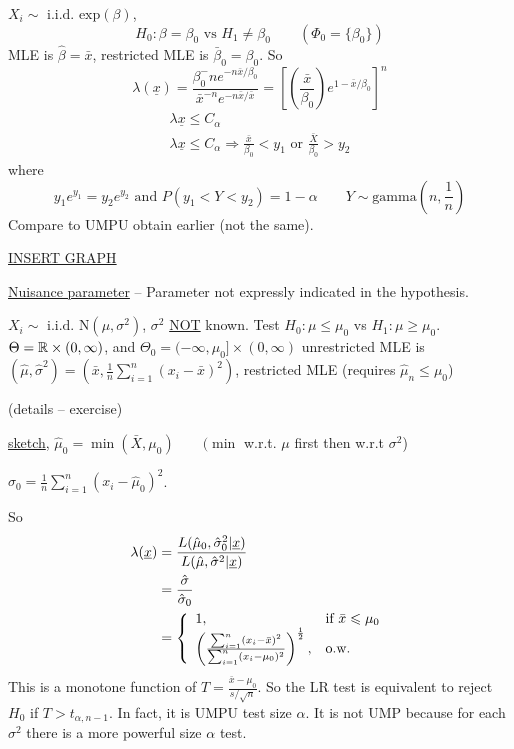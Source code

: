 \documentclass[english, 11pt]{article}
\newcommand{\lp}{\left(}
\newcommand{\rp}{\right)}
\begin{document}
\begin{exmp}
$X_i\sim\text{ i.i.d. exp}(\beta)$, 
$$
H_0:\beta=\beta_0\text{ vs }H_1\not= \beta_0\qquad (\Phi_0=\{\beta_0\})
$$
MLE is $\hat{\beta}=\bar{x}$, restricted MLE is $\bar{\beta}_0=\beta_0$. So 
$$
\lambda(\underline{x})=\frac{\beta_0^-ne^{-n\bar{x}/\beta_0}}{\bar{x}^{-n}e^{-n\bar{x}/\bar{x}}}=\left[\lp \frac{\bar{x}}{\beta_0}\rp e^{1-\bar{x}/\beta_0}\right]^n
$$
$$
\begin{aligned}
\lambda{\underline{x}}\leqslant C_\alpha\\
\lambda{\underline{x}}\leqslant C_\alpha\Rightarrow\frac{\bar{x}}{\beta_0}<y_1\text{ or }\frac{\bar{X}}{\beta_0}>y_2
\end{aligned}
$$
where
$$
y_1e^{y_1}=y_2e^{y_2}\text{  and  }P\lp y_1<Y<y_2\rp=1-\alpha\qquad Y\sim \text{gamma}\lp n, \frac{1}{n}\rp
$$
Compare to UMPU obtain earlier (not the same).

{\Huge \underline{INSERT GRAPH}}
\end{exmp}

\vspace{5 mm}

\underline{Nuisance parameter} -- Parameter not expressly indicated in the hypothesis.

\begin{exmp}\label{exmp:525}
$X_i\sim \text{ i.i.d. N}\lp \mu, \sigma^2\rp$, $\sigma^2$ \underline{NOT} known. Test $H_0:\mu\leq \mu_0$ vs $H_1:\mu\geq\mu_0$. $\Theta={\mathbb{R}}\times(0, \infty)$, and $\Theta_0=(-\infty, \mu_0]\times(0, \infty)$ unrestricted MLE is $(\hat{\mu}, \hat{\sigma}^2)=\lp \bar{x}, \frac{1}{n}\sum_{i=1}^n(x_i-\bar{x})^2\rp$, restricted MLE (requires $\hat{\mu}_n\leqslant \mu_0$)

(details -- exercise)

\underline{sketch}, $\hat{\mu}_0=\min(\bar{X}, \mu_0)\qquad (\min$ w.r.t. $\mu$ first then w.r.t $\sigma^2$)

$\hat{\sigma}_0=\frac{1}{n}\sum_{i=1}^n(x_i-\hat{\mu}_0)^2$.

So
$$\begin{aligned}
\lambda(\underline{x})&=\frac{L(\hat{\mu}_0, \hat{\sigma}_0^2|\underline{x})}{L(\hat{\mu}, \hat{\sigma}^2|\underline{x})}\\
&=\frac{\hat{\sigma}}{\hat{\sigma}_0}\\
&=\left\{\begin{array}{l l}
1,  &\text{if }\bar{x}\leqslant\mu_0\\
\lp\frac{\sum_{i=1}^n(x_i-\bar{x})^2}{\sum_{i=1}^n(x_i-\mu_0)^2}\rp^{\frac{1}{2}},   &\text{o.w.}
\end{array}\right.
\end{aligned}
$$
This is a monotone function of $T=\frac{\bar{x}-\mu_0}{s/\sqrt{n}}$. So the LR test is equivalent to reject $H_0$ if $T>t_{\alpha, n-1}$. In fact, it is UMPU test size $\alpha$. It is not UMP because for each $\sigma^2$ there is a more powerful size $\alpha$ test.
\end{exmp}
\end{document}
